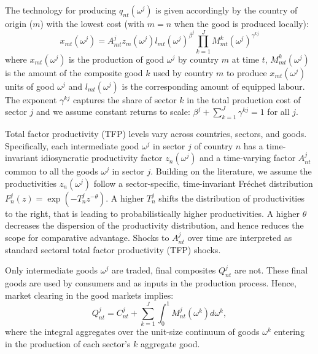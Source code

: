 \documentclass[12pt]{article}
\begin{document}
The technology for producing $%
q_{nt}(\omega ^{j})$ is given accordingly by the country of origin ($m$)
with the lowest cost (with $m=n$ when the good is produced locally): 
\begin{equation}
x_{mt}(\omega ^{j})=A_{mt}^{j}z_{m}(\omega ^{j})l_{mt}(\omega ^{j})^{\beta
^{j}}
\prod_{k=1}^J M_{mt}^k(\omega ^{j})^{\gamma^{kj}}
\end{equation}%
where $x_{mt}(\omega ^{j})$ is the production of good $\omega ^{j}$ by
country $m$ at time $t$, $M_{mt}^k(\omega ^{j})$ is the amount of the
composite good $k$ used by country $m$ to produce $x_{mt}(\omega ^{j})$
units of good $\omega ^{j}$ and $l_{mt}(\omega ^{j})$ is the corresponding
amount of equipped labour. The exponent $\gamma^{kj}$ captures the share of sector $k$ in the total production cost of sector $j$ and we assume constant returns to scale: $\beta^{j}+\sum_{k=1}^J \gamma^{kj}=1$ for all $j$. 

Total factor productivity (TFP) levels vary
across countries, sectors, and goods. Specifically, each intermediate good $%
\omega ^{j}$ in sector $j$ of country $n$ has a time-invariant idiosyncratic
productivity factor $z_{n}(\omega ^{j})$ and a time-varying factor $%
A_{nt}^{j}$ common to all the goods $\omega ^{j}$ in sector $j$. Building on
the literature, we assume the productivities $z_{n}(\omega ^{j})$ follow a
sector-specific, time-invariant Fr\'{e}chet distribution $F_{n}^{j}(z)=\exp
(-T_{n}^{j}z^{-\theta })$. A higher $T_{n}^{j}$ shifts the distribution of
productivities to the right, that is leading to probabilistically higher
productivities. A higher $\theta $ decreases the dispersion of the
productivity distribution, and hence reduces the scope for comparative
advantage. Shocks to $A_{nt}^{j}$ over time are interpreted as standard
sectoral total factor productivity (TFP) shocks.

Only intermediate goods $\omega^j$ are traded, final composites $Q^j_{nt}$ are not. These final goods are used by consumers and as inputs in the production process. Hence,
market clearing in the good markets implies: 
\begin{equation*}
Q_{nt}^j = C_{nt}^j + \sum_{k=1}^{J}\int_{0}^{1}M_{nt}^j(\omega^{k})d\omega ^{k},
\end{equation*}
where the integral aggregates over the unit-size continuum of goods $%
\omega^{k}$ entering in the production of each sector's $k$ aggregate good.
\end{document}
